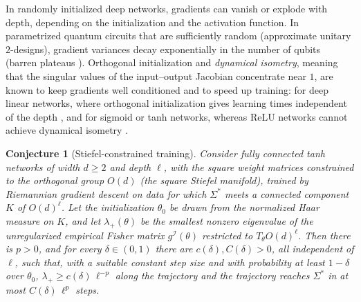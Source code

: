 \documentclass[11pt,reqno]{amsart}
\newtheorem{conjecture}[theorem]{Conjecture}
\theoremstyle{definition}
\newcommand{\Fisher}{\mathcal{I}}
\numberwithin{equation}{section}
\begin{document}
In randomly initialized deep networks, gradients can vanish or explode with depth, depending on the initialization and the activation function. In parametrized quantum circuits that are sufficiently random (approximate unitary $2$-designs), gradient variances decay exponentially in the number of qubits (barren plateaus \cite{mcclean2018}). Orthogonal initialization and \emph{dynamical isometry}, meaning that the singular values of the input--output Jacobian concentrate near $1$, are known to keep gradients well conditioned and to speed up training: for deep linear networks, where orthogonal initialization gives learning times independent of the depth \cite{saxe2014}, and for sigmoid or tanh networks, whereas ReLU networks cannot achieve dynamical isometry \cite{pennington2017}.

\begin{conjecture}[Stiefel-constrained training]
\label{thm:vanishing_gradient_bypass}
Consider fully connected tanh networks of width $d \ge 2$ and depth $\ell$, with the square weight matrices constrained to the orthogonal group $O(d)$ (the square Stiefel manifold), trained by Riemannian gradient descent on data for which $\Sigma^*$ meets a connected component $K$ of $O(d)^\ell$. Let the initialization $\theta_0$ be drawn from the normalized Haar measure on $K$, and let $\lambda_+(\theta)$ be the smallest nonzero eigenvalue of the \emph{unregularized} empirical Fisher matrix $g^{\Fisher}(\theta)$ restricted to $T_\theta O(d)^\ell$. Then there is $p > 0$, and for every $\delta \in (0, 1)$ there are $c(\delta), C(\delta) > 0$, all independent of $\ell$, such that, with a suitable constant step size and with probability at least $1 - \delta$ over $\theta_0$, $\lambda_+ \ge c(\delta)\,\ell^{-p}$ along the trajectory and the trajectory reaches $\Sigma^*$ in at most $C(\delta)\,\ell^p$ steps.
\end{conjecture}
\end{document}
